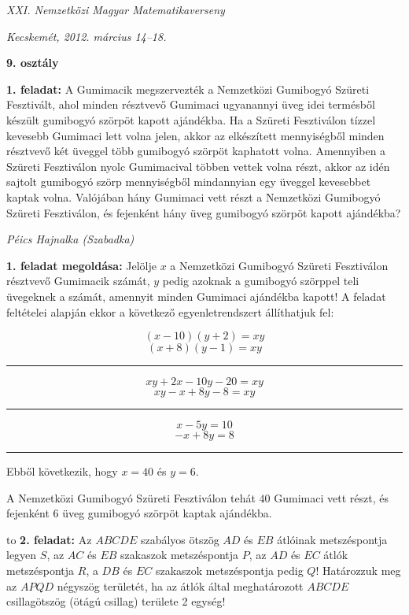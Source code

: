 \documentclass[a4paper,10pt]{article}
\def\ki#1#2{\hfill {\it #1 (#2)}\medskip}
\begin{document}
\begin{center} \Large {\em XXI. Nemzetközi Magyar Matematikaverseny} \end{center}
\begin{center} \large{\em Kecskemét, 2012. március 14--18.} \end{center}
\smallskip
\begin{center} \large{\bf 9. osztály} \end{center}
\bigskip 

{\bf 1. feladat: } A Gumimacik megszervezték a Nemzetközi Gumibogyó Szüreti Fesztivált, ahol minden
résztvevő Gumimaci ugyanannyi üveg idei termésből készült gumibogyó szörpöt kapott ajándékba.
Ha a Szüreti Fesztiválon tízzel kevesebb Gumimaci lett volna jelen, akkor az elkészített
mennyiségből minden résztvevő két üveggel több gumibogyó szörpöt kaphatott volna. Amennyiben
a Szüreti Fesztiválon nyolc Gumimacival többen vettek volna részt, akkor az idén sajtolt
gumibogyó szörp mennyiségből mindannyian egy üveggel kevesebbet kaptak volna. Valójában
hány Gumimaci vett részt a Nemzetközi Gumibogyó Szüreti Fesztiválon, és fejenként hány üveg
gumibogyó szörpöt kapott ajándékba?

\ki{Péics Hajnalka}{Szabadka}\medskip

{\bf 1. feladat megoldása: }
Jelölje $x$ a Nemzetközi Gumibogyó Szüreti Fesztiválon résztvevő Gumimacik
számát, $y$ pedig azoknak a gumibogyó szörppel teli üvegeknek a számát, amennyit minden
Gumimaci ajándékba kapott! A feladat feltételei alapján ekkor a következő egyenletrendszert állíthatjuk fel:

\begin{center}
$$(x-10)(y+2)=xy$$
$$(x+8)(y-1)=xy$$
\rule{3cm}{0.01cm}
$$xy+2x-10y-20=xy$$
$$xy-x+8y-8=xy$$
\rule{4cm}{0.01cm}
$$x-5y=10$$
$$-x+8y=8$$
\rule{2cm}{0.01cm}
\end{center}

Ebből következik, hogy $x=40$ és $y=6$.

A Nemzetközi Gumibogyó Szüreti Fesztiválon tehát $40$ Gumimaci vett részt, és fejenként $6$
üveg gumibogyó szörpöt kaptak ajándékba.
\medskip

\hbox to 
{\bf 2. feladat: } Az $ABCDE$ szabályos ötszög $AD$ és $EB$ átlóinak metszéspontja legyen $S$, az $AC$ és $EB$ szakaszok
metszéspontja $P$, az $AD$ és $EC$ átlók metszéspontja $R$, a $DB$ és $EC$ szakaszok metszéspontja pedig
$Q$! Határozzuk meg az $APQD$ négyszög területét, ha az átlók által meghatározott $ABCDE$
csillagötszög (ötágú csillag) területe 2 egység!
\end{document}
